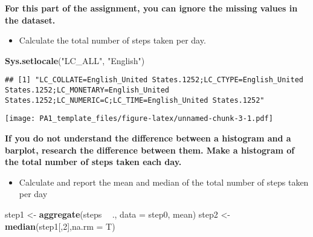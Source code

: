 \documentclass[
]{article}
\newenvironment{Shaded}{\begin{snugshade}}{\end{snugshade}}
\newcommand{\DataTypeTok}[1]{\textcolor[rgb]{0.13,0.29,0.53}{#1}}
\newcommand{\DecValTok}[1]{\textcolor[rgb]{0.00,0.00,0.81}{#1}}
\newcommand{\KeywordTok}[1]{\textcolor[rgb]{0.13,0.29,0.53}{\textbf{#1}}}
\newcommand{\NormalTok}[1]{#1}
\newcommand{\OperatorTok}[1]{\textcolor[rgb]{0.81,0.36,0.00}{\textbf{#1}}}
\newcommand{\StringTok}[1]{\textcolor[rgb]{0.31,0.60,0.02}{#1}}
\providecommand{\tightlist}{%
  \setlength{\itemsep}{0pt}\setlength{\parskip}{0pt}}
\begin{document}
\textbf{For this part of the assignment, you can ignore the missing
values in the dataset.}

\begin{itemize}
\tightlist
\item
  Calculate the total number of steps taken per day.
\end{itemize}

\begin{Shaded}
\begin{Highlighting}[]
\KeywordTok{Sys.setlocale}\NormalTok{(}\StringTok{"LC_ALL"}\NormalTok{, }\StringTok{"English"}\NormalTok{)}
\end{Highlighting}
\end{Shaded}

\begin{verbatim}
## [1] "LC_COLLATE=English_United States.1252;LC_CTYPE=English_United States.1252;LC_MONETARY=English_United States.1252;LC_NUMERIC=C;LC_TIME=English_United States.1252"
\end{verbatim}

\begin{Shaded}
\end{Shaded}

\texttt{[image: PA1\_template\_files/figure-latex/unnamed-chunk-3-1.pdf]}

\textbf{If you do not understand the difference between a histogram and
a barplot, research the difference between them. Make a histogram of the
total number of steps taken each day.}

\begin{itemize}
\tightlist
\item
  Calculate and report the mean and median of the total number of steps
  taken per day
\end{itemize}

\begin{Shaded}
\begin{Highlighting}[]
\NormalTok{step1 <-}\StringTok{ }\KeywordTok{aggregate}\NormalTok{(steps }\OperatorTok{~}\StringTok{ }\NormalTok{., }\DataTypeTok{data =}\NormalTok{ step0, mean)}
\NormalTok{step2 <-}\StringTok{ }\KeywordTok{median}\NormalTok{(step1[,}\DecValTok{2}\NormalTok{],}\DataTypeTok{na.rm =}\NormalTok{ T)}
\end{Highlighting}
\end{Shaded}
\end{document}
